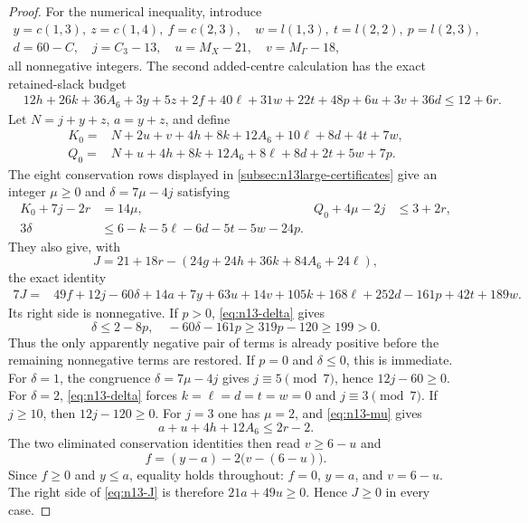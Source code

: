 \begin{proof}
For the numerical inequality, introduce
\[
 \begin{gathered}
 y=c(1,3),\ z=c(1,4),\ f=c(2,3),\quad
 w=l(1,3),\ t=l(2,2),\ p=l(2,3),\\
 d=60-C,\quad j=C_3-13,\quad
 u=M_X-21,\quad v=M_\Gamma-18,
 \end{gathered}
\]
all nonnegative integers.  The second added-centre calculation has the
exact retained-slack budget
\begin{align}
 &12h+26k+36A_6+3y+5z+2f+40\ell+31w+22t+48p
       +6u+3v+36d\leq12+6r.                       \label{eq:n13-second-budget}
\end{align}
Let $N=j+y+z$, $a=y+z$, and define
\begin{align*}
 K_0={}&N+2u+v+4h+8k+12A_6+10\ell+8d+4t+7w,\\
 Q_0={}&N+u+4h+8k+12A_6+8\ell+8d+2t+5w+7p.
\end{align*}
The eight conservation rows displayed in
\cref{subsec:n13large-certificates} give an integer $\mu\geq0$ and
$\delta=7\mu-4j$ satisfying
\begin{align}
 K_0+7j-2r&=14\mu,& Q_0+4\mu-2j&\leq3+2r,
                                                               \label{eq:n13-mu}\\
 3\delta&\leq6-k-5\ell-6d-5t-5w-24p.             \label{eq:n13-delta}
\end{align}
They also give, with
\[
 J=21+18r-(24g+24h+36k+84A_6+24\ell),
\]
the exact identity
\begin{align}
7J={}&49f+12j-60\delta+14a+7y+63u+14v+105k
 +168\ell+252d-161p+42t+189w.                    \label{eq:n13-J}
\end{align}
 Its right side is nonnegative.  If $p>0$, \eqref{eq:n13-delta} gives
\[
 \delta\leq2-8p,\quad
 -60\delta-161p\geq319p-120\geq199>0.
\]
Thus the only apparently negative pair of terms is already positive before
the remaining nonnegative terms are restored.
If $p=0$ and $\delta\leq0$, this is immediate.  For $\delta=1$, the
congruence $\delta=7\mu-4j$ gives $j\equiv5\pmod7$, hence
$12j-60\geq0$.  For $\delta=2$, \eqref{eq:n13-delta} forces
$k=\ell=d=t=w=0$ and $j\equiv3\pmod7$.  If $j\geq10$, then
$12j-120\geq0$.  For $j=3$ one has $\mu=2$, and
\eqref{eq:n13-mu} gives
\[
 a+u+4h+12A_6\leq2r-2.
\]
The two eliminated conservation identities then read $v\geq6-u$ and
\[
 f=(y-a)-2\bigl(v-(6-u)\bigr).
\]
Since $f\geq0$ and $y\leq a$, equality holds throughout:
$f=0$, $y=a$, and $v=6-u$.  The right side of
\eqref{eq:n13-J} is therefore $21a+49u\geq0$.  Hence $J\geq0$ in every
case.


\end{proof}
